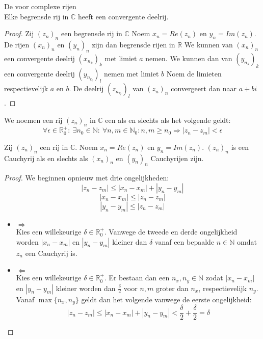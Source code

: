 \documentclass[main.tex]{subfiles}
\begin{document}
\begin{st}
  \label{st:bolzano-complexe-rijen}
  De  voor complexe rijen\\
  Elke begrensde rij in $\mathbb{C}$ heeft een convergente deelrij.

  \begin{proof}
    Zij $(z_{n})_{n}$ een begrensde rij in $\mathbb{C}$
    Noem $x_{n} = Re(z_{n})$ en $y_{n} = Im(z_{n})$.
    De rijen $(x_{n})_{n}$ en $(y_{n})_{n}$ zijn dan begrensde rijen in $\mathbb{R}$
    We kunnen van $(x_{n})_{n}$ een convergente deelrij $(x_{n_{k}})_{k}$ met limiet $a$ nemen.
    We kunnen dan van $(y_{n_{k}})_{k}$ een convergente deelrij $(y_{n_{k_{l}}})_{l}$ nemen met limiet $b$
    Noem de limieten respectievelijk $a$ en $b$.
    De deelrij $(z_{n_{k_{l}}})_{l}$ van $(z_{n})_{n}$ convergeert dan naar $a+bi$.
  \end{proof}
\end{st}

\begin{de}
  We noemen een rij $(z_{n})_{n}$ in $\mathbb{C}$ een  als en slechts als het volgende geldt:
  \[ \forall \epsilon \in \mathbb{R}_{0}^{+}:\ \exists n_{0}\in \mathbb{N}:\ \forall n,m\in \mathbb{N}_{0}: n,m\ge n_{0} \Rightarrow |z_{n}-z_{m}| < \epsilon \]
\end{de}

\begin{pr}
  Zij $(z_{n})_{n}$ een rij in $\mathbb{C}$.
  Noem $x_{n} = Re(z_{n})$ en $y_{n} = Im(z_{n})$.
  $(z_{n})_{n}$ is een Cauchyrij als en slechts als $(x_{n})_{n}$ en $(y_{n})_{n}$ Cauchyrijen zijn.

  \begin{proof}
    We beginnen opnieuw met drie ongelijkheden:
    \[ |z_{n}-z_{m}| \le |x_{n}-x_{m}| + |y_{n}-y_{m}| \]
    \[ |x_{n}-x_{m}| \le |z_{n}-z_{m}| \]
    \[ |y_{n}-y_{m}| \le |z_{n}-z_{m}| \]
    \begin{itemize}
    \item $\Rightarrow$\\
      Kies een willekeurige $\delta \in \mathbb{R}_{0}^{+}$.
      Vanwege de tweede en derde ongelijkheid worden $|x_{n}-x_{m}|$ en $|y_{n}-y_{m}|$ kleiner dan $\delta$ vanaf een bepaalde $n\in \mathbb{N}$ omdat $z_{n}$ een Cauchyrij is.
    \item $\Leftarrow$\\
      Kies een willekeurige $\delta \in \mathbb{R}_{0}^{+}$.
      Er bestaan dan een $n_{x},n_{y}\in \mathbb{N}$ zodat $|x_{n}-x_{m}|$ en $|y_{n}-y_{m}|$ kleiner worden dan $\frac{\delta}{2}$ voor $n,m$ groter dan $n_{x}$, respectievelijk $n_{y}$.
      Vanaf $\max\{n_{x},n_{y}\}$ geldt dan het volgende vanwege de eerste ongelijkheid:
      \[ |z_{n}-z_{m}| \le |x_{n}-x_{m}| + |y_{n}-y_{m}| < \frac{\delta}{2}+\frac{\delta}{2} = \delta \]
    \end{itemize}
  \end{proof}
\end{pr}
\end{document}
